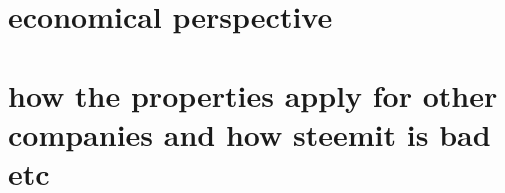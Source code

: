 
\section{economical perspective} %

\section{how the properties apply for other companies and how steemit is bad etc}


